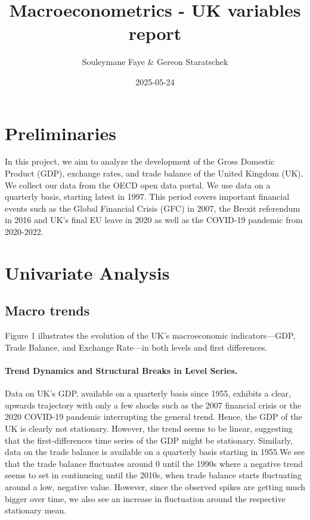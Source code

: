 \documentclass[
]{article}
\title{Macroeconometrics - UK variables report}
\author{Souleymane Faye \& Gereon Staratschek}
\date{2025-05-24}
\begin{document}
\maketitle

\section{Preliminaries}

In this project, we aim to analyze the development of the Gross Domestic
Product (GDP), exchange rates, and trade balance of the United Kingdom
(UK). We collect our data from the OECD open data portal. We use data on
a quarterly basis, starting latest in 1997. This period covers important
financial events such as the Global Financial Crisis (GFC) in 2007, the
Brexit referendum in 2016 and UK's final EU leave in 2020 as well as the
COVID-19 pandemic from 2020-2022.

\section{Univariate Analysis}

\subsection{Macro trends}

Figure 1 illustrates the evolution of the UK’s macroeconomic indicators—GDP, Trade Balance, 
and Exchange Rate—in both levels and first differences.

\paragraph*{Trend Dynamics and Structural Breaks in Level Series.} 
Data on UK's GDP, available on a quarterly basis
since 1955, exhibits a clear, upwards trajectory with only a few
shocks such as the 2007 financial crisis or the 2020 COVID-19 pandemic 
interrupting the general trend. Hence, the GDP of the UK is clearly not
stationary. However, the trend seems to be linear, suggesting that the
first-differences time series of the GDP might be stationary. Similarly, data on 
the trade balance is available on a quarterly basis starting in 1955.We see that 
the trade balance fluctuates around 0 until the 1990s where a negative trend seems to set
in continueing until the 2010s, when trade balance starts fluctuating
around a low, negative value. However, since the observed spikes are
getting much bigger over time, we also see an increase in fluctuation
around the respective stationary mean.
\end{document}
